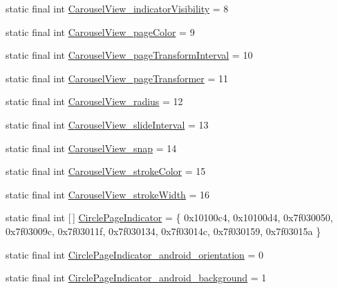 \begin{DoxyCompactItemize}
\item 
static final int \mbox{\hyperlink{classcom_1_1synnapps_1_1carouselview_1_1_r_1_1styleable_a11cd87cb7feaf4315f597c417839bdf1}{Carousel\+View\+\_\+indicator\+Visibility}} = 8
\item 
static final int \mbox{\hyperlink{classcom_1_1synnapps_1_1carouselview_1_1_r_1_1styleable_acbeba5aba5453cfed1912442626e1b81}{Carousel\+View\+\_\+page\+Color}} = 9
\item 
static final int \mbox{\hyperlink{classcom_1_1synnapps_1_1carouselview_1_1_r_1_1styleable_a955d9795eaa5c31108716ee174767efa}{Carousel\+View\+\_\+page\+Transform\+Interval}} = 10
\item 
static final int \mbox{\hyperlink{classcom_1_1synnapps_1_1carouselview_1_1_r_1_1styleable_a81391ace123fa87f1ba3934a714f7e38}{Carousel\+View\+\_\+page\+Transformer}} = 11
\item 
static final int \mbox{\hyperlink{classcom_1_1synnapps_1_1carouselview_1_1_r_1_1styleable_ac3f9c1ee020c9da673708c25d50c31c7}{Carousel\+View\+\_\+radius}} = 12
\item 
static final int \mbox{\hyperlink{classcom_1_1synnapps_1_1carouselview_1_1_r_1_1styleable_a89a8b568e5adfbf160c9e585d37c856d}{Carousel\+View\+\_\+slide\+Interval}} = 13
\item 
static final int \mbox{\hyperlink{classcom_1_1synnapps_1_1carouselview_1_1_r_1_1styleable_a1442543d9f8846905aa9995128196c1f}{Carousel\+View\+\_\+snap}} = 14
\item 
static final int \mbox{\hyperlink{classcom_1_1synnapps_1_1carouselview_1_1_r_1_1styleable_aa479b7ff3e27837e9d8757a48b4f02ae}{Carousel\+View\+\_\+stroke\+Color}} = 15
\item 
static final int \mbox{\hyperlink{classcom_1_1synnapps_1_1carouselview_1_1_r_1_1styleable_af070221c6eb0d450a2c1a2d47f61f028}{Carousel\+View\+\_\+stroke\+Width}} = 16
\item 
static final int \mbox{[}$\,$\mbox{]} \mbox{\hyperlink{classcom_1_1synnapps_1_1carouselview_1_1_r_1_1styleable_a8c18432822057b47827072fa40111a75}{Circle\+Page\+Indicator}} = \{ 0x10100c4, 0x10100d4, 0x7f030050, 0x7f03009c, 0x7f03011f, 0x7f030134, 0x7f03014c, 0x7f030159, 0x7f03015a \}
\item 
static final int \mbox{\hyperlink{classcom_1_1synnapps_1_1carouselview_1_1_r_1_1styleable_a5f9f596d0678e1228a546638e0cc0eb8}{Circle\+Page\+Indicator\+\_\+android\+\_\+orientation}} = 0
\item 
static final int \mbox{\hyperlink{classcom_1_1synnapps_1_1carouselview_1_1_r_1_1styleable_a072dfcd4fabeaff60c895d37bb088574}{Circle\+Page\+Indicator\+\_\+android\+\_\+background}} = 1

\end{DoxyCompactItemize}
